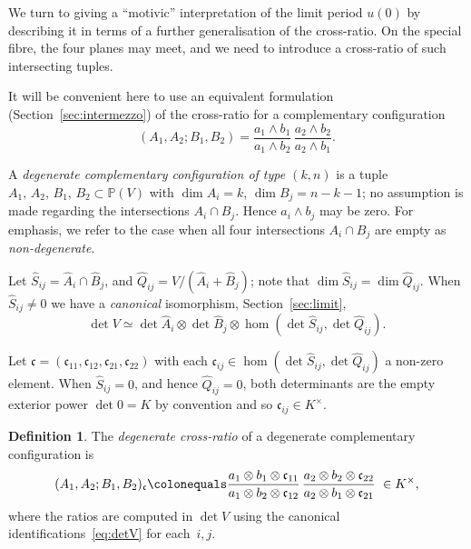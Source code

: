 \documentclass[11pt,a4paper]{amsart}
\newcommand{\pv}{\mathbb{P}(V)}
\newcommand{\xc}{\mathfrak{c}}
\theoremstyle{plain}
\theoremstyle{definition}
\newtheorem{definition}[theorem]{Definition}
\theoremstyle{remark}
\newcommand{\coleq}{\colonequals}
\begin{document}
\medskip

We turn to giving a ``motivic'' interpretation of the limit period $u(0)$ by describing it in terms of a further generalisation of the cross-ratio. On the special fibre, the four planes may meet, and we need to introduce a cross-ratio of such intersecting tuples.

It will be convenient here to use an equivalent formulation (Section~\ref{sec:intermezzo}) of the cross-ratio for a complementary configuration
\begin{equation}\label{eq:cr-wedge}
  (A_1,A_2;B_1,B_2) = \frac{a_1 \wedge b_1}{a_1 \wedge b_2}\, \frac{a_2 \wedge b_2}{a_2 \wedge b_1}.
\end{equation}

A \emph{degenerate complementary configuration of type $(k,n)$} is a tuple $A_1,\, A_2,\, B_1,\, B_2 \subset \pv$ with $\dim A_i = k$, $\dim B_j = n-k-1$; no assumption is made regarding the intersections $A_i \cap B_j$. Hence $a_i \wedge b_j$ may be zero. For emphasis, we refer to the case when all four intersections $A_i \cap B_j$ are empty as \emph{non-degenerate}.

Let $\hat S_{ij} = \hat A_i \cap \hat B_j$, and $\hat Q_{ij} = V/(\hat A_i + \hat B_j)$; note that $\dim \hat S_{ij} = \dim \hat Q_{ij}$. When $\hat S_{ij} \neq 0$ we have a \emph{canonical} isomorphism, Section~\ref{sec:limit},
\begin{equation}\label{eq:detV}
  \det V \simeq \det \hat A_i \otimes \det \hat B_j \otimes \hom(\det \hat S_{ij}, \det \hat Q_{ij}).
\end{equation}

Let $\xc = (\xc_{11}, \xc_{12}, \xc_{21}, \xc_{22})$ with each $\xc_{ij} \in \hom(\det \hat S_{ij}, \det \hat Q_{ij})$ a non-zero element. When $\hat S_{ij} = 0$, and hence $\hat Q_{ij} = 0$, both determinants are the empty exterior power $\det 0 = K$ by convention and so $\xc_{ij} \in K^\times$.

\begin{definition}
  The \emph{degenerate cross-ratio} of a degenerate complementary configuration is
  \begin{equation}\label{eq:xc-cr}
    (A_1,A_2;B_1,B_2)_\xc \coleq
      \frac{a_1 \otimes b_1 \otimes \xc_{11}}{a_1 \otimes b_2 \otimes \xc_{12}}\,
      \frac{a_2 \otimes b_2 \otimes \xc_{22}}{a_2 \otimes b_1 \otimes \xc_{21}} \ \in K^\times,
  \end{equation}
where the ratios are computed in $\det V$ using the canonical identifications~\eqref{eq:detV} for each~$i,j$. 
\end{definition}
\end{document}
